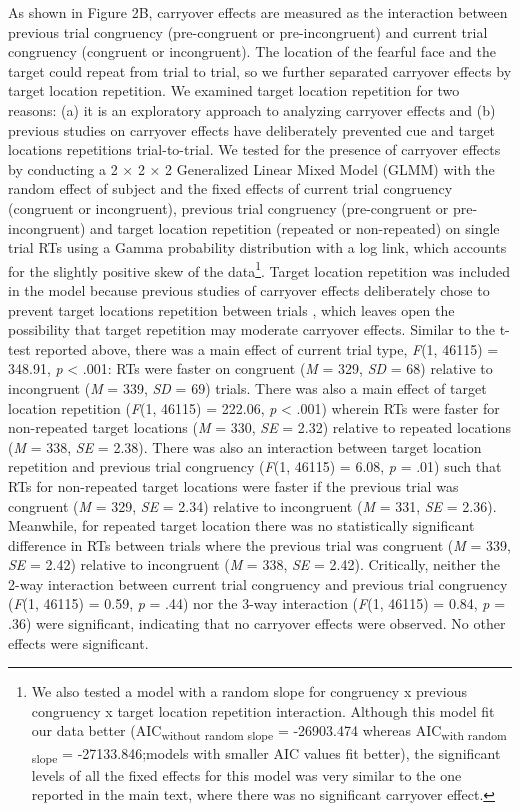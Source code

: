 \documentclass{article}
\begin{document}
As shown in Figure 2B, carryover effects are measured as the interaction between previous trial congruency (pre-congruent or pre-incongruent) and current trial congruency (congruent or incongruent). The location of the fearful face and the target could repeat from trial to trial, so we further separated carryover effects by target location repetition. We examined target location repetition for two reasons: (a) it is an exploratory approach to analyzing carryover effects and (b) previous studies on carryover effects \parencite{Gladwin2019a} have deliberately prevented cue and target locations repetitions trial-to-trial. We tested for the presence of carryover effects by conducting a 2 × 2 × 2 Generalized Linear Mixed Model (GLMM) with the random effect of subject and the fixed effects of current trial congruency (congruent or incongruent), previous trial congruency (pre-congruent or pre-incongruent) and target location repetition (repeated or non-repeated) on single trial RTs using a Gamma probability distribution with a log link, which accounts for the slightly positive skew of the data\footnote{We also tested a model with a random slope for congruency x previous congruency x target location repetition interaction. Although this model fit our data better (AIC\textsubscript{without random slope} = -26903.474 whereas AIC\textsubscript{with random slope} = -27133.846;models with smaller AIC values fit better), the significant levels of all the fixed effects for this model was very similar to the one reported in the main text, where there was no significant carryover effect.

}. Target location repetition was included in the model because previous studies of carryover effects deliberately chose to prevent target locations repetition between trials \parencite{Gladwin2019a}, which leaves open the possibility that target repetition may moderate carryover effects. Similar to the t-test reported above, there was a main effect of current trial type, \emph{F}(1, 46115) = 348.91, \emph{p }< .001: RTs were faster on congruent (\emph{M }= 329, \emph{SD}\emph{ }= 68) relative to incongruent (\emph{M }= 339, \emph{SD }= 69) trials. There was also a main effect of target location repetition (\emph{F}(1, 46115) = 222.06, \emph{p }< .001) wherein RTs were faster for non-repeated target locations (\emph{M }= 330, \emph{SE }= 2.32) relative to repeated locations (\emph{M }= 338, \emph{SE }= 2.38). There was also an interaction between target location repetition and previous trial congruency (\emph{F}(1, 46115) = 6.08, \emph{p }= .01) such that RTs for non-repeated target locations were faster if the previous trial was congruent (\emph{M }= 329, \emph{SE }= 2.34) relative to incongruent (\emph{M }= 331, \emph{SE }= 2.36). Meanwhile, for repeated target location there was no statistically significant difference in RTs between trials where the previous trial was congruent (\emph{M }= 339, \emph{SE }= 2.42) relative to incongruent (\emph{M }= 338, \emph{SE }= 2.42). Critically, neither the 2-way interaction between current trial congruency and previous trial congruency (\emph{F}(1, 46115) = 0.59, \emph{p }= .44) nor the 3-way interaction (\emph{F}(1, 46115) = 0.84, \emph{p }= .36) were significant, indicating that no carryover effects were observed. No other effects were significant.
\end{document}
